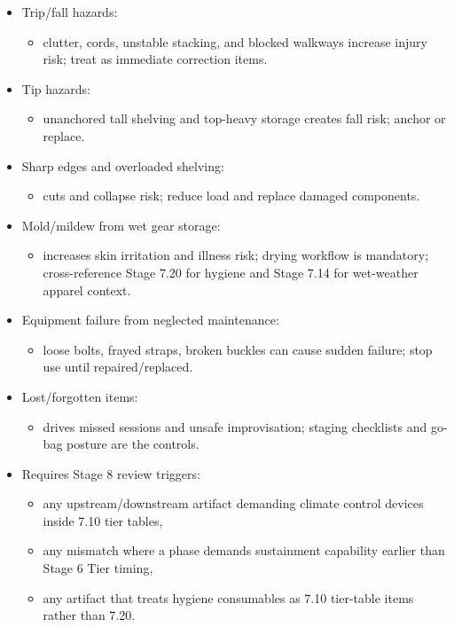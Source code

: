 \documentclass[10pt]{article}
\begin{document}
\begin{itemize}
\item Trip/fall hazards:
  \begin{itemize}
  \item clutter, cords, unstable stacking, and blocked walkways increase injury risk; treat as immediate correction items.
  \end{itemize}
\item Tip hazards:
  \begin{itemize}
  \item unanchored tall shelving and top-heavy storage creates fall risk; anchor or replace.
  \end{itemize}
\item Sharp edges and overloaded shelving:
  \begin{itemize}
  \item cuts and collapse risk; reduce load and replace damaged components.
  \end{itemize}
\item Mold/mildew from wet gear storage:
  \begin{itemize}
  \item increases skin irritation and illness risk; drying workflow is mandatory; cross-reference Stage 7.20 for hygiene and Stage 7.14 for wet-weather apparel context.
  \end{itemize}
\item Equipment failure from neglected maintenance:
  \begin{itemize}
  \item loose bolts, frayed straps, broken buckles can cause sudden failure; stop use until repaired/replaced.
  \end{itemize}
\item Lost/forgotten items:
  \begin{itemize}
  \item drives missed sessions and unsafe improvisation; staging checklists and go-bag posture are the controls.
  \end{itemize}
\item Requires Stage 8 review triggers:
  \begin{itemize}
  \item any upstream/downstream artifact demanding climate control devices inside 7.10 tier tables,
  \item any mismatch where a phase demands sustainment capability earlier than Stage 6 Tier timing,
  \item any artifact that treats hygiene consumables as 7.10 tier-table items rather than 7.20.
  \end{itemize}
\end{itemize}
\end{document}
